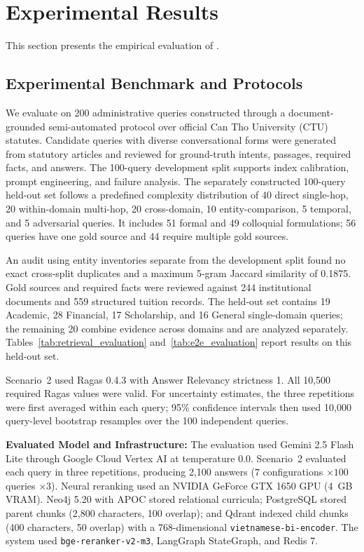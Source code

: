 \section{Experimental Results}
\label{sec:exp}

This section presents the empirical evaluation of \system{}.

\subsection{Experimental Benchmark and Protocols}
\label{sec:dataset}

We evaluate \system{} on 200 administrative queries constructed through a document-grounded semi-automated protocol over official Can Tho University (CTU) statutes. Candidate queries with diverse conversational forms were generated from statutory articles and reviewed for ground-truth intents, passages, required facts, and answers. The 100-query development split supports index calibration, prompt engineering, and failure analysis. The separately constructed 100-query held-out set follows a predefined complexity distribution of 40 direct single-hop, 20 within-domain multi-hop, 20 cross-domain, 10 entity-comparison, 5 temporal, and 5 adversarial queries. It includes 51 formal and 49 colloquial formulations; 56 queries have one gold source and 44 require multiple gold sources.

An audit using entity inventories separate from the development split found no exact cross-split duplicates and a maximum 5-gram Jaccard similarity of 0.1875. Gold sources and required facts were reviewed against 244 institutional documents and 559 structured tuition records. The held-out set contains 19 Academic, 28 Financial, 17 Scholarship, and 16 General single-domain queries; the remaining 20 combine evidence across domains and are analyzed separately. Tables~\ref{tab:retrieval_evaluation} and~\ref{tab:e2e_evaluation} report results on this held-out set.

Scenario~2 used Ragas 0.4.3 with Answer Relevancy strictness 1. All 10,500 required Ragas values were valid. For uncertainty estimates, the three repetitions were first averaged within each query; 95\% confidence intervals then used 10,000 query-level bootstrap resamples over the 100 independent queries.

\noindent\textbf{Evaluated Model and Infrastructure:} The evaluation used Gemini 2.5 Flash Lite through Google Cloud Vertex AI at temperature 0.0. Scenario~2 evaluated each query in three repetitions, producing 2,100 answers ($7$ configurations $\times100$ queries $\times3$). Neural reranking used an NVIDIA GeForce GTX 1650 GPU (4~GB VRAM). Neo4j 5.20 with APOC stored relational curricula; PostgreSQL stored parent chunks (2,800 characters, 100 overlap); and Qdrant indexed child chunks (400 characters, 50 overlap) with a 768-dimensional \texttt{vietnamese-bi-encoder}. The system used \texttt{bge-reranker-v2-m3}, LangGraph StateGraph, and Redis 7.

